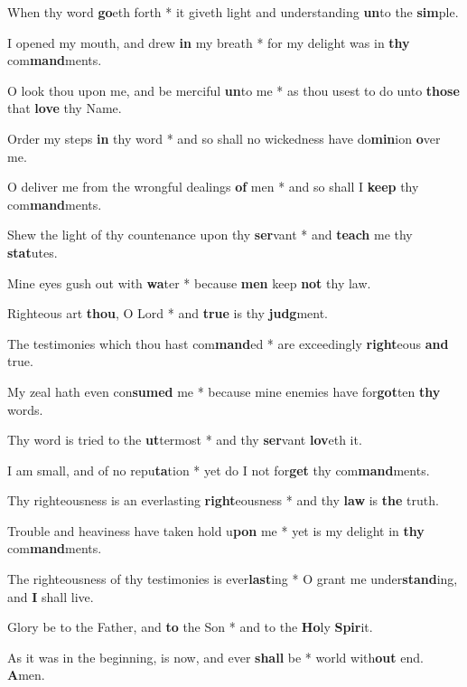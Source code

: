 \begin{multicols}{2}
	When thy word \textbf{go}eth forth * it giveth light and understanding \textbf{un}to the \textbf{sim}ple.
	
	I opened my mouth, and drew \textbf{in} my breath * for my delight was in \textbf{thy} com\textbf{mand}ments.
	
	O look thou upon me, and be merciful \textbf{un}to me * as thou usest to do unto \textbf{those} that \textbf{love} thy Name.
	
	Order my steps \textbf{in} thy word * and so shall no wickedness have do\textbf{min}ion \textbf{o}ver me.
	
	O deliver me from the wrongful dealings \textbf{of} men * and so shall I \textbf{keep} thy com\textbf{mand}ments.
	
	Shew the light of thy countenance upon thy \textbf{ser}vant * and \textbf{teach} me thy \textbf{stat}utes.
	
	Mine eyes gush out with \textbf{wa}ter * because \textbf{men} keep \textbf{not} thy law.
	
	Righteous art \textbf{thou}, O Lord * and \textbf{true} is thy \textbf{judg}ment.
	
	The testimonies which thou hast com\textbf{mand}ed * are exceedingly \textbf{right}eous \textbf{and} true.
	
	My zeal hath even con\textbf{sumed} me * because mine enemies have for\textbf{got}ten \textbf{thy} words.
	
	Thy word is tried to the \textbf{ut}termost * and thy \textbf{ser}vant \textbf{lov}eth it.
	
	I am small, and of no repu\textbf{ta}tion * yet do I not for\textbf{get} thy com\textbf{mand}ments.
	
	Thy righteousness is an everlasting \textbf{right}eousness * and thy \textbf{law} is \textbf{the} truth.
	
	Trouble and heaviness have taken hold u\textbf{pon} me * yet is my delight in \textbf{thy} com\textbf{mand}ments.
	
	The righteousness of thy testimonies is ever\textbf{last}ing * O grant me under\textbf{stand}ing, and \textbf{I} shall live.
	
	Glory be to the Father, and \textbf{to} the Son * and to the \textbf{Ho}ly \textbf{Spir}it.
	
	As it was in the beginning, is now, and ever \textbf{shall} be * world with\textbf{out} end. \textbf{A}men.
\end{multicols}